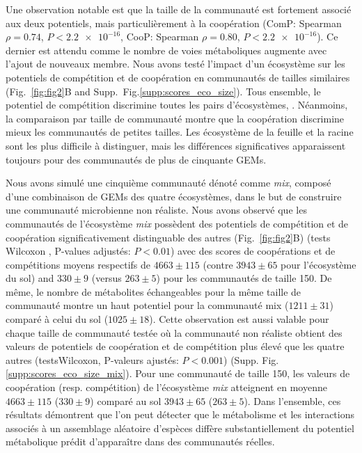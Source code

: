 Une observation notable est que la taille de la communauté est fortement associé aux deux potentiels, mais particulièrement à la coopération (\textsf{ComP}: Spearman $\rho = 0.74$, $P < \num{2.2e-16}$, \textsf{CooP}: Spearman $\rho = 0.80$, $P < \num{2.2e-16}$). Ce dernier est attendu comme le nombre de voies métaboliques augmente avec l'ajout de nouveaux membre. Nous avons testé l'impact d'un écosystème sur les potentiels de compétition et de coopération en communautés de tailles similaires (Fig.~\ref{fig:fig2}B and Supp.~Fig.\ref{supp:scores_eco_size}). Tous ensemble, le potentiel de compétition discrimine toutes les pairs d'écosystèmes, . Néanmoins, la comparaison par taille de communauté montre que la coopération discrimine mieux les communautés de petites tailles. Les écosystème de la feuille et la racine sont les plus difficile à distinguer, mais les différences significatives apparaissent toujours pour des communautés de plus de cinquante GEMs.

Nous avons simulé une cinquième communauté dénoté comme \emph{mix}, composé d'une combinaison de GEMs des quatre écosystèmes, dans le but de construire une communauté microbienne non réaliste. Nous avons observé que les communautés de l'écosystème \emph{mix} possèdent des potentiels de compétition et de coopération significativement distinguable des autres (Fig.~\ref{fig:fig2}B) (tests Wilcoxon , P-values adjustés: $P < 0.01$) avec des scores de coopérations et de compétitions moyens respectifs de $4663\pm 115$ (contre $3943\pm 65$ pour l'écosystème du sol) and $330\pm 9$ (versus $263\pm 5$) pour les communautés de taille 150. De même, le nombre de métabolites échangeables pour la même taille de communauté montre un haut potentiel pour la communauté mix ($1211\pm 31$) comparé à celui du sol ($1025\pm 18$). Cette observation est aussi valable pour chaque taille de communauté testée où la communauté non réaliste obtient des valeurs de potentiels de coopération et de compétition plus élevé que les quatre autres (testsWilcoxon, P-valeurs ajustés: $P <0.001$) (Supp. Fig. \ref{supp:scores_eco_size_mix}). Pour une communauté de taille 150, les valeurs de coopération (resp. compétition) de l'écosystème \emph{mix} atteignent en moyenne $4663\pm 115$ ($330\pm 9$) comparé au sol $3943\pm 65$ ($263\pm 5$). Dans l'ensemble, ces résultats démontrent que l'on peut détecter que le métabolisme et les interactions associés à un assemblage aléatoire d'espèces diffère substantiellement du potentiel métabolique prédit d'apparaître dans des communautés réelles.



